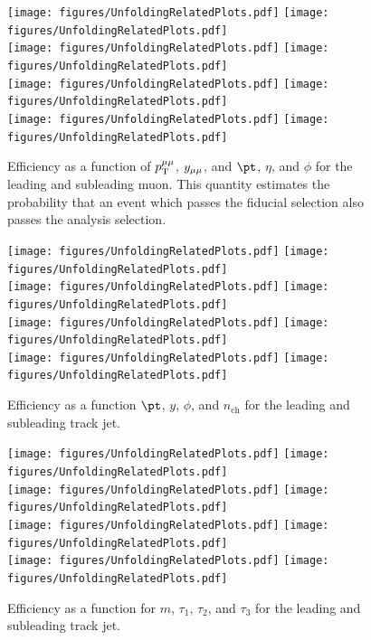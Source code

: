 \begin{figure}[h!]
  \centering
  \texttt{[image: figures/UnfoldingRelatedPlots.pdf]}
  \texttt{[image: figures/UnfoldingRelatedPlots.pdf]} \\
  \texttt{[image: figures/UnfoldingRelatedPlots.pdf]}
  \texttt{[image: figures/UnfoldingRelatedPlots.pdf]} \\
  \texttt{[image: figures/UnfoldingRelatedPlots.pdf]}
  \texttt{[image: figures/UnfoldingRelatedPlots.pdf]} \\
  \texttt{[image: figures/UnfoldingRelatedPlots.pdf]}
  \texttt{[image: figures/UnfoldingRelatedPlots.pdf]} \\
  \caption{Efficiency as a function of $p_\mathrm{T}^{\mu\mu}$, $y_{\mu\mu}$, and $\pt$, $\eta$, and $\phi$ for the leading and subleading muon. This quantity estimates the probability that an event which passes the fiducial selection also passes the analysis selection.}
  \label{fig:EffDilep}
\end{figure}

\begin{figure}[h!]
  \centering
  \texttt{[image: figures/UnfoldingRelatedPlots.pdf]}
  \texttt{[image: figures/UnfoldingRelatedPlots.pdf]} \\
  \texttt{[image: figures/UnfoldingRelatedPlots.pdf]}
  \texttt{[image: figures/UnfoldingRelatedPlots.pdf]} \\
  \texttt{[image: figures/UnfoldingRelatedPlots.pdf]}
  \texttt{[image: figures/UnfoldingRelatedPlots.pdf]} \\
  \texttt{[image: figures/UnfoldingRelatedPlots.pdf]}
  \texttt{[image: figures/UnfoldingRelatedPlots.pdf]}
  \caption{Efficiency as a function $\pt$, $y$, $\phi$, and $n_{\text{ch}}$ for the leading and subleading track jet.}
  \label{fig:EffTJ1}
\end{figure}

\begin{figure}[h!]
  \centering
  \texttt{[image: figures/UnfoldingRelatedPlots.pdf]}
  \texttt{[image: figures/UnfoldingRelatedPlots.pdf]} \\
  \texttt{[image: figures/UnfoldingRelatedPlots.pdf]}
  \texttt{[image: figures/UnfoldingRelatedPlots.pdf]} \\
  \texttt{[image: figures/UnfoldingRelatedPlots.pdf]}
  \texttt{[image: figures/UnfoldingRelatedPlots.pdf]} \\
  \texttt{[image: figures/UnfoldingRelatedPlots.pdf]}
  \texttt{[image: figures/UnfoldingRelatedPlots.pdf]}
  \caption{Efficiency as a function for $m$, $\tau_1$, $\tau_2$, and $\tau_3$ for the leading and subleading track jet.}
  \label{fig:EffTJ2}
\end{figure}

